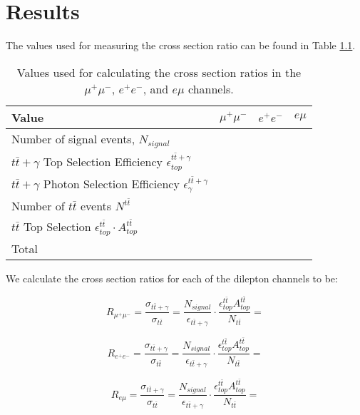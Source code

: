 \chapter{Results} \label{chap-Results}

The values used for measuring the cross section ratio can be found in Table \ref{tab-xsectvariables}.

\begin{table}[h!]
\begin{center}
\begin{tabular}{l|c|c|c}
\hline
	\textbf{Value} & $\mu^+\mu^-$ & $e^+e^-$ & $e\mu$ \\
\hline
	Number of signal events, $N_{signal}$ & & & \\
	$t\bar{t}+\gamma$ Top Selection Efficiency $\epsilon^{t\bar{t}+\gamma}_{top}$ & & & \\
	$t\bar{t}+\gamma$ Photon Selection Efficiency $\epsilon^{t\bar{t}+\gamma}_{\gamma}$ & & & \\
	Number of $t\bar{t}$ events $N^{t\bar{t}}$ & & & \\
	$t\bar{t}$ Top Selection $\epsilon^{t\bar{t}}_{top} \cdot A^{t\bar{t}}_{top}$ & & & \\
\hline
	Total & & & \\
\hline
\end{tabular} 
\end{center}
\caption{Values used for calculating the cross section ratios in the $\mu^+\mu^-$, $e^+e^-$, and $e\mu$ channels.}
\label{tab-xsectvariables}
\end{table}

We calculate the cross section ratios for each of the dilepton channels to be:

\begin{equation}
	R_{\mu^+\mu^-} = \frac{\sigma_{t\bar{t}+\gamma}}{\sigma_{t\bar{t}}} = \frac{N_{signal}}{\epsilon_{t\bar{t}+\gamma}} \cdot \frac{\epsilon^{t\bar{t}}_{top} A^{t\bar{t}}_{top}}{N_{t\bar{t}}} = 
\end{equation}

\begin{equation}
	R_{e^+e^-} = \frac{\sigma_{t\bar{t}+\gamma}}{\sigma_{t\bar{t}}} = \frac{N_{signal}}{\epsilon_{t\bar{t}+\gamma}} \cdot \frac{\epsilon^{t\bar{t}}_{top} A^{t\bar{t}}_{top}}{N_{t\bar{t}}} = 
\end{equation}

\begin{equation}
	R_{e\mu} = \frac{\sigma_{t\bar{t}+\gamma}}{\sigma_{t\bar{t}}} = \frac{N_{signal}}{\epsilon_{t\bar{t}+\gamma}} \cdot \frac{\epsilon^{t\bar{t}}_{top} A^{t\bar{t}}_{top}}{N_{t\bar{t}}} =  
\end{equation}

